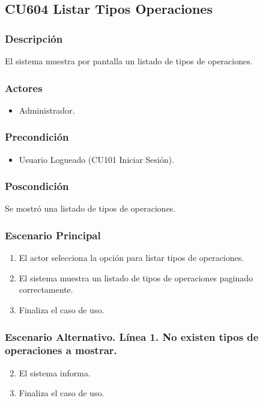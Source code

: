 \subsection{CU604 Listar Tipos Operaciones}
\subsubsection{Descripci\'{o}n}
El sistema muestra por pantalla un listado de tipos de operaciones.
\subsubsection{Actores}
\begin{itemize}
\item Administrador.
\end{itemize}
\subsubsection{Precondici\'{o}n}
\begin{itemize}
\item Usuario Logueado (CU101 Iniciar Sesi\'{o}n).
\end{itemize}
\subsubsection{Poscondici\'{o}n}
Se mostr\'{o} una listado de tipos de operaciones.
\subsubsection{Escenario Principal}
\begin{enumerate}
\item El actor selecciona la opci\'{o}n para listar tipos de operaciones.
\item El sistema muestra un listado de tipos de operaciones paginado correctamente.
\item Finaliza el caso de uso.
\end{enumerate}
\subsubsection{Escenario Alternativo. L\'{i}nea 1. No existen tipos de operaciones a mostrar.}
\begin{enumerate}
\setcounter{enumi}{1}
\item El sistema informa.
\item Finaliza el caso de uso.
\end{enumerate}